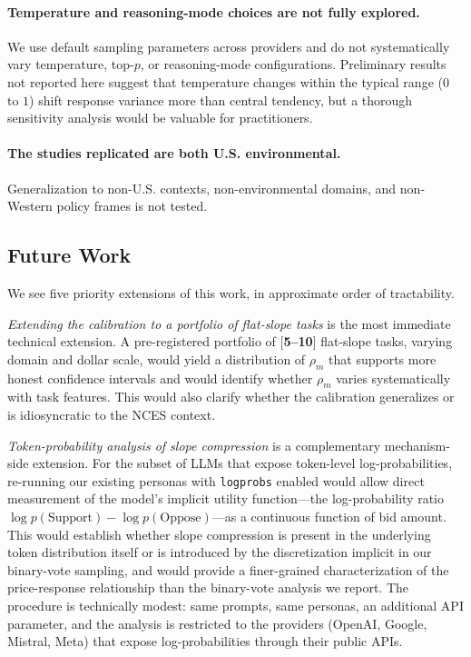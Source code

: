 \documentclass[12pt]{article}
\begin{document}
\paragraph{Temperature and reasoning-mode choices are not fully explored.} We use default sampling parameters across providers and do not systematically vary temperature, top-$p$, or reasoning-mode configurations. Preliminary results not reported here suggest that temperature changes within the typical range ($0$ to $1$) shift response variance more than central tendency, but a thorough sensitivity analysis would be valuable for practitioners.

\paragraph{The studies replicated are both U.S. environmental.} Generalization to non-U.S. contexts, non-environmental domains, and non-Western policy frames is not tested.

\subsection{Future Work}\label{sec:disc-future-work}

We see five priority extensions of this work, in approximate order of tractability.

\textit{Extending the calibration to a portfolio of flat-slope tasks} is the most immediate technical extension. A pre-registered portfolio of [\textbf{5--10}] flat-slope tasks, varying domain and dollar scale, would yield a distribution of $\rho_m$ that supports more honest confidence intervals and would identify whether $\rho_m$ varies systematically with task features. This would also clarify whether the calibration generalizes or is idiosyncratic to the NCES context.

\textit{Token-probability analysis of slope compression} is a complementary mechanism-side extension. For the subset of LLMs that expose token-level log-probabilities, re-running our existing personas with \texttt{logprobs} enabled would allow direct measurement of the model's implicit utility function---the log-probability ratio $\log p(\text{Support}) - \log p(\text{Oppose})$---as a continuous function of bid amount. This would establish whether slope compression is present in the underlying token distribution itself or is introduced by the discretization implicit in our binary-vote sampling, and would provide a finer-grained characterization of the price-response relationship than the binary-vote analysis we report. The procedure is technically modest: same prompts, same personas, an additional API parameter, and the analysis is restricted to the providers (OpenAI, Google, Mistral, Meta) that expose log-probabilities through their public APIs.
\end{document}
